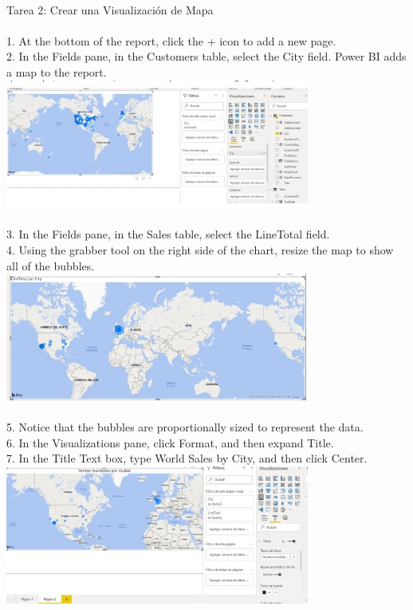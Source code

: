 \documentclass[preprint,12pt]{elsarticle}
\begin{document}
\begin{itemize}
				
		\\ 	Tarea 2: Crear una Visualización de Mapa \\ 
			\\ 1. At the bottom of the report, click the + icon to add a new page.
			\\ 2. In the Fields pane, in the Customers table, select the City field. Power BI adds a map to the report.
			\\ \includegraphics[width=10cm]{./IMAGENES/5.2} \\
			\\ 3. In the Fields pane, in the Sales table, select the LineTotal field.
			\\ 4. Using the grabber tool on the right side of the chart, resize the map to show all of the bubbles.
			\\ \includegraphics[width=10cm]{./IMAGENES/5.4} \\
		\\ 	5. Notice that the bubbles are proportionally sized to represent the data.
			\\ 6. In the Visualizations pane, click Format, and then expand Title.
			\\ 7. In the Title Text box, type World Sales by City, and then click Center.
			\\ \includegraphics[width=10cm]{./IMAGENES/5.7} \\

\end{itemize}
\end{document}

